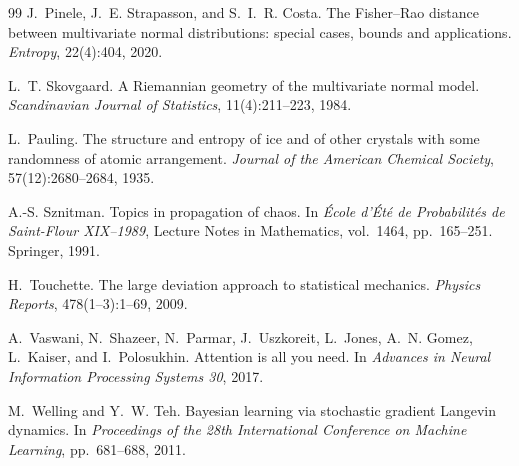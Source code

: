 \documentclass[11pt]{article}
\theoremstyle{plain}
\theoremstyle{definition}
\begin{document}
\begin{thebibliography}{99}
J.~Pinele, J.~E. Strapasson, and S.~I.~R. Costa.
\newblock The Fisher--Rao distance between multivariate normal distributions: special cases, bounds and applications.
\newblock \emph{Entropy}, 22(4):404, 2020.

L.~T. Skovgaard.
\newblock A Riemannian geometry of the multivariate normal model.
\newblock \emph{Scandinavian Journal of Statistics}, 11(4):211--223, 1984.

L.~Pauling.
\newblock The structure and entropy of ice and of other crystals with some randomness of
  atomic arrangement.
\newblock \emph{Journal of the American Chemical Society}, 57(12):2680--2684, 1935.

A.-S. Sznitman.
\newblock Topics in propagation of chaos.
\newblock In \emph{\'Ecole d'\'Et\'e de Probabilit\'es de Saint-Flour XIX--1989},
  Lecture Notes in Mathematics, vol.~1464, pp.~165--251. Springer, 1991.

H.~Touchette.
\newblock The large deviation approach to statistical mechanics.
\newblock \emph{Physics Reports}, 478(1--3):1--69, 2009.

A.~Vaswani, N.~Shazeer, N.~Parmar, J.~Uszkoreit, L.~Jones, A.~N. Gomez, L.~Kaiser, and
  I.~Polosukhin.
\newblock Attention is all you need.
\newblock In \emph{Advances in Neural Information Processing Systems 30}, 2017.

M.~Welling and Y.~W. Teh.
\newblock Bayesian learning via stochastic gradient Langevin dynamics.
\newblock In \emph{Proceedings of the 28th International Conference on Machine Learning},
  pp.~681--688, 2011.

\end{thebibliography}
\end{document}
